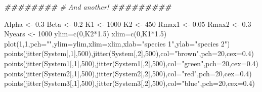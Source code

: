 \documentclass[
]{article}
\newenvironment{Shaded}{\begin{snugshade}}{\end{snugshade}}
\newcommand{\AttributeTok}[1]{\textcolor[rgb]{0.77,0.63,0.00}{#1}}
\newcommand{\CommentTok}[1]{\textcolor[rgb]{0.56,0.35,0.01}{\textit{#1}}}
\newcommand{\DecValTok}[1]{\textcolor[rgb]{0.00,0.00,0.81}{#1}}
\newcommand{\DocumentationTok}[1]{\textcolor[rgb]{0.56,0.35,0.01}{\textbf{\textit{#1}}}}
\newcommand{\FloatTok}[1]{\textcolor[rgb]{0.00,0.00,0.81}{#1}}
\newcommand{\FunctionTok}[1]{\textcolor[rgb]{0.00,0.00,0.00}{#1}}
\newcommand{\NormalTok}[1]{#1}
\newcommand{\OtherTok}[1]{\textcolor[rgb]{0.56,0.35,0.01}{#1}}
\newcommand{\SpecialCharTok}[1]{\textcolor[rgb]{0.00,0.00,0.00}{#1}}
\newcommand{\StringTok}[1]{\textcolor[rgb]{0.31,0.60,0.02}{#1}}
\begin{document}
\begin{Shaded}
\begin{Highlighting}[]
\DocumentationTok{\#\#\#\#\#\#\#\#}
\CommentTok{\# And another!}
\DocumentationTok{\#\#\#\#\#\#\#\#\#}

\NormalTok{Alpha }\OtherTok{\textless{}{-}} \FloatTok{0.3}
\NormalTok{Beta }\OtherTok{\textless{}{-}} \FloatTok{0.2}
\NormalTok{K1 }\OtherTok{\textless{}{-}} \DecValTok{1000}
\NormalTok{K2 }\OtherTok{\textless{}{-}} \DecValTok{450}
\NormalTok{Rmax1 }\OtherTok{\textless{}{-}} \FloatTok{0.05}
\NormalTok{Rmax2 }\OtherTok{\textless{}{-}} \FloatTok{0.3}
\NormalTok{Nyears }\OtherTok{\textless{}{-}} \DecValTok{1000}
\NormalTok{ylim}\OtherTok{=}\FunctionTok{c}\NormalTok{(}\DecValTok{0}\NormalTok{,K2}\SpecialCharTok{*}\FloatTok{1.5}\NormalTok{)}
\NormalTok{xlim}\OtherTok{=}\FunctionTok{c}\NormalTok{(}\DecValTok{0}\NormalTok{,K1}\SpecialCharTok{*}\FloatTok{1.5}\NormalTok{)}
\FunctionTok{plot}\NormalTok{(}\DecValTok{1}\NormalTok{,}\DecValTok{1}\NormalTok{,}\AttributeTok{pch=}\StringTok{""}\NormalTok{,}\AttributeTok{ylim=}\NormalTok{ylim,}\AttributeTok{xlim=}\NormalTok{xlim,}\AttributeTok{xlab=}\StringTok{"species 1"}\NormalTok{,}\AttributeTok{ylab=}\StringTok{"species 2"}\NormalTok{)}
\FunctionTok{points}\NormalTok{(}\FunctionTok{jitter}\NormalTok{(System[,}\DecValTok{1}\NormalTok{],}\DecValTok{500}\NormalTok{),}\FunctionTok{jitter}\NormalTok{(System[,}\DecValTok{2}\NormalTok{],}\DecValTok{500}\NormalTok{),}\AttributeTok{col=}\StringTok{"brown"}\NormalTok{,}\AttributeTok{pch=}\DecValTok{20}\NormalTok{,}\AttributeTok{cex=}\FloatTok{0.4}\NormalTok{)}
\FunctionTok{points}\NormalTok{(}\FunctionTok{jitter}\NormalTok{(System1[,}\DecValTok{1}\NormalTok{],}\DecValTok{500}\NormalTok{),}\FunctionTok{jitter}\NormalTok{(System1[,}\DecValTok{2}\NormalTok{],}\DecValTok{500}\NormalTok{),}\AttributeTok{col=}\StringTok{"green"}\NormalTok{,}\AttributeTok{pch=}\DecValTok{20}\NormalTok{,}\AttributeTok{cex=}\FloatTok{0.4}\NormalTok{)}
\FunctionTok{points}\NormalTok{(}\FunctionTok{jitter}\NormalTok{(System2[,}\DecValTok{1}\NormalTok{],}\DecValTok{500}\NormalTok{),}\FunctionTok{jitter}\NormalTok{(System2[,}\DecValTok{2}\NormalTok{],}\DecValTok{500}\NormalTok{),}\AttributeTok{col=}\StringTok{"red"}\NormalTok{,}\AttributeTok{pch=}\DecValTok{20}\NormalTok{,}\AttributeTok{cex=}\FloatTok{0.4}\NormalTok{)}
\FunctionTok{points}\NormalTok{(}\FunctionTok{jitter}\NormalTok{(System3[,}\DecValTok{1}\NormalTok{],}\DecValTok{500}\NormalTok{),}\FunctionTok{jitter}\NormalTok{(System3[,}\DecValTok{2}\NormalTok{],}\DecValTok{500}\NormalTok{),}\AttributeTok{col=}\StringTok{"blue"}\NormalTok{,}\AttributeTok{pch=}\DecValTok{20}\NormalTok{,}\AttributeTok{cex=}\FloatTok{0.4}\NormalTok{)}


\end{Highlighting}
\end{Shaded}
\end{document}
